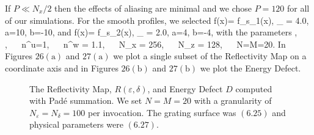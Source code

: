 If $P \ll N_x/2$ then the effects of aliasing are minimal and we chose $P=120$ for all of our simulations. For the smooth profiles, we selected
\be
f(x)= f_{s_1}(x),
\quad
\varepsilon_{} = 4.0, \quad
a=10,
\quad 
b=-10,
\ee
and
\be
f(x)= f_{s_2}(x),
\quad
\varepsilon_{} = 2.0, \quad
a=4,
\quad 
b=-4,
\ee
with the parameters
\be
{},
~~
,
~~
n^u=1,
~~
n^w = 1.1,
~~ N_x = 256,
~~ N_z = 128,
~~
N=M=20.
\ee
In Figures $26(\text{a})$ and $27(\text{a})$ we plot a single subset of the Reflectivity Map on a coordinate axis and in
Figures $26(\text{b})$ and $27(\text{b})$ we plot the Energy Defect. 
\vspace{-18mm}
\begin{figure}[H]
    \centering
    \vspace{2mm}
    \caption{The Reflectivity Map, $R(\varepsilon,\delta)$, and Energy Defect $D$
    computed with Pad\'e summation. We set $N=M=20$ 
    with a granularity of $N_{\varepsilon}=N_{\delta}=100$ per invocation. The grating surface was $(6.25)$ and physical parameters were $(6.27)$.}
    \label{Fig:RM:Single Case 2}
\end{figure}
